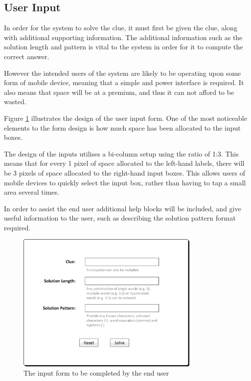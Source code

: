 \subsection{User Input} 
\label{sub:user_input}

In order for the system to solve the clue, it must first be given the clue, 
along with additional supporting information. The additional information such as 
the solution length and pattern is vital to the system in order for it to 
compute the correct answer. 

However the intended users of the system are likely to be operating upon some 
form of mobile device, meaning that a simple and power interface is required. It
also means that space will be at a premium, and thus it can not afford to be 
wasted.

Figure \ref{fig:input_form} illustrates the design of the user input form. One 
of the most noticeable elements to the form design is how much space has been 
allocated to the input boxes. 

The design of the inputs utilises a bi-column setup using the ratio of 1:3. This
means that for every 1 pixel of space allocated to the left-hand labels, there 
will be 3 pixels of space allocated to the right-hand input boxes. This allows 
users of mobile devices to quickly select the input box, rather than having to 
tap a small area several times.

In order to assist the end user additional help blocks will be included, and 
give useful information to the user, such as describing the solution pattern 
format required.

\begin{figure}[H]
  \centering
  \includegraphics[width=0.8\textwidth]{ui/form.jpg}
  \caption{The input form to be completed by the end user}
  \label{fig:input_form}
\end{figure}

